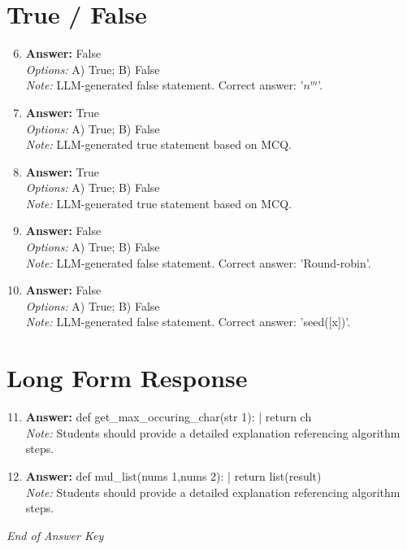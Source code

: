\documentclass[12pt]{article}
\begin{document}
\section*{True / False}
\begin{enumerate}[label=\arabic*.]
\setcounter{enumi}{5}
\item \textbf{Answer:} False
\\ \textit{Options:} A) True; B) False
\\ \textit{Note:} LLM-generated false statement. Correct answer: '$n^m$'.
\item \textbf{Answer:} True
\\ \textit{Options:} A) True; B) False
\\ \textit{Note:} LLM-generated true statement based on MCQ.
\item \textbf{Answer:} True
\\ \textit{Options:} A) True; B) False
\\ \textit{Note:} LLM-generated true statement based on MCQ.
\item \textbf{Answer:} False
\\ \textit{Options:} A) True; B) False
\\ \textit{Note:} LLM-generated false statement. Correct answer: 'Round-robin'.
\item \textbf{Answer:} False
\\ \textit{Options:} A) True; B) False
\\ \textit{Note:} LLM-generated false statement. Correct answer: 'seed([x])'.
\end{enumerate}

\section*{Long Form Response}
\begin{enumerate}[label=\arabic*.]
\setcounter{enumi}{10}
\item \textbf{Answer:} def get\_max\_occuring\_char(str 1): | return ch
\\ \textit{Note:} Students should provide a detailed explanation referencing algorithm steps.
\item \textbf{Answer:} def mul\_list(nums 1,nums 2): | return list(result)
\\ \textit{Note:} Students should provide a detailed explanation referencing algorithm steps.
\end{enumerate}

\vfill
\noindent\textit{End of Answer Key}
\end{document}
